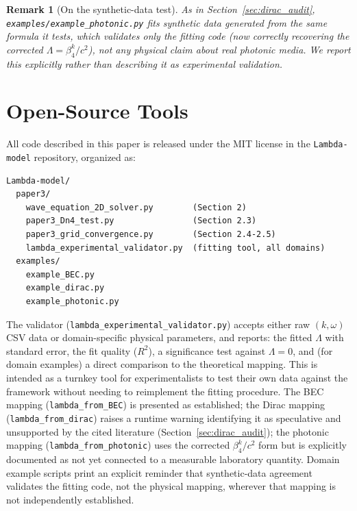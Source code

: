 \documentclass[12pt,a4paper]{article}
\newtheorem{remark}{Remark}
\begin{document}
\begin{remark}[On the synthetic-data test]
As in Section~\ref{sec:dirac_audit}, \texttt{examples/example\_photonic.py}
fits synthetic data generated from the same formula it tests, which
validates only the fitting code (now correctly recovering the corrected
$\Lambda=\beta_4^k/c^2$), not any physical claim about real photonic
media. We report this explicitly rather than describing it as
experimental validation.
\end{remark}

\section{Open-Source Tools}
\label{sec:tools}

All code described in this paper is released under the MIT license in
the \texttt{Lambda-model} repository, organized as:

\begin{verbatim}
Lambda-model/
  paper3/
    wave_equation_2D_solver.py        (Section 2)
    paper3_Dn4_test.py                (Section 2.3)
    paper3_grid_convergence.py        (Section 2.4-2.5)
    lambda_experimental_validator.py  (fitting tool, all domains)
  examples/
    example_BEC.py
    example_dirac.py
    example_photonic.py
\end{verbatim}

The validator (\texttt{lambda\_experimental\_validator.py}) accepts
either raw $(k,\omega)$ CSV data or domain-specific physical parameters,
and reports: the fitted $\Lambda$ with standard error, the fit quality
($R^2$), a significance test against $\Lambda=0$, and (for domain
examples) a direct comparison to the theoretical mapping. This is
intended as a turnkey tool for experimentalists to test their own data
against the framework without needing to reimplement the fitting
procedure. The BEC mapping (\texttt{lambda\_from\_BEC}) is presented as
established; the Dirac mapping (\texttt{lambda\_from\_dirac}) raises a
runtime warning identifying it as speculative and unsupported by the
cited literature (Section~\ref{sec:dirac_audit}); the photonic mapping
(\texttt{lambda\_from\_photonic}) uses the corrected $\beta_4^k/c^2$
form but is explicitly documented as not yet connected to a measurable
laboratory quantity. Domain example scripts print an explicit reminder
that synthetic-data agreement validates the fitting code, not the
physical mapping, wherever that mapping is not independently
established.
\end{document}

